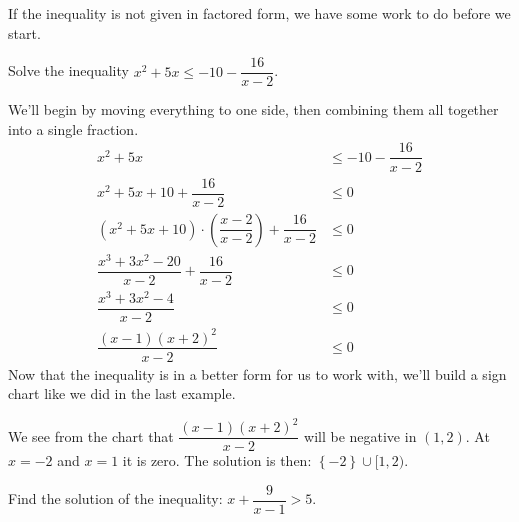 \documentclass{ximera}
\begin{document}
If the inequality is not given in factored form, we have some work to do before we start.
\begin{example}
	Solve the inequality $\displaystyle x^2 + 5x \leq -10 -\dfrac{16}{x-2}$.
	\begin{explanation}
		We'll begin by moving everything to one side, then combining them all together into a single fraction.
		\begin{align*}
			x^2 + 5x &\leq -10 -\dfrac{16}{x-2}\\
			x^2 + 5x +10 +\dfrac{16}{x-2} &\leq 0\\
			\left(x^2+5x+10\right) \cdot \left(\dfrac{x-2}{x-2}\right) +\dfrac{16}{x-2} &\leq 0\\
			\dfrac{x^3+3x^2-20}{x-2} + \dfrac{16}{x-2} &\leq 0\\
			\dfrac{x^3+3x^2-4}{x-2} &\leq 0\\
			\dfrac{(x-1)(x+2)^2}{x-2} &\leq 0
		\end{align*}
		Now that the inequality is in a better form for us to work with, we'll build a sign chart like we did in the last example.


		We see from the chart that $\displaystyle \dfrac{(x-1)(x+2)^2}{x-2}$ will be negative in $(1,2)$.  At $x=-2$ and $x=1$ it is zero.
		The solution is then: $\left\{ -2\right\} \cup [ 1, 2 )$.
	\end{explanation}
\end{example}


\begin{problem}
	Find the solution of the inequality: $\displaystyle x + \dfrac{9}{x-1} > 5$.
	\begin{multipleChoice}
		\choice{$[-1,\infty)$}
		\choice{$\{-1\} \cup [2,\infty)$}
	\end{multipleChoice}
\end{problem}
\end{document}
